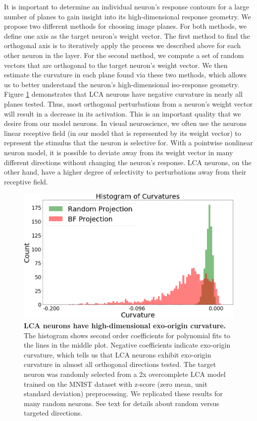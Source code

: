 It is important to determine an individual neuron’s response contours for a large number of planes to gain insight into its high-dimensional response geometry.
We propose two different methods for choosing image planes.
For both methods, we define one axis as the target neuron's weight vector.
The first method to find the orthogonal axis is to iteratively apply the process we described above for each other neuron in the layer.
For the second method, we compute a set of random vectors that are orthogonal to the target neuron’s weight vector.
We then estimate the curvature in each plane found via these two methods, which allows us to better understand the neuron’s high-dimensional iso-response geometry.
Figure \ref{fig:ch4_iso_contour_lca_hists} demonstrates that LCA neurons have negative curvature in nearly all planes tested.
Thus, most orthogonal perturbations from a neuron's weight vector will result in a decrease in its activation.
This is an important quality that we desire from our model neurons.
In visual neuroscience, we often use the neurons linear receptive field (in our model that is represented by its weight vector) to represent the stimulus that the neuron is selective for.
With a pointwise nonlinear neuron model, it is possible to deviate away from its weight vector in many different directions without changing the neuron's response.
LCA neurons, on the other hand, have a higher degree of selectivity to perturbations away from their receptive field.

\begin{figure}
    \centering
    \includegraphics[width=\textwidth]{figures/iso_contour_lca_hists.png}
    \caption{\textbf{LCA neurons have high-dimensional exo-origin curvature.} The histogram shows second order coefficients for polynomial fits to the lines in the middle plot. Negative coefficients indicate exo-origin curvature, which tells us that LCA neurons exhibit exo-origin curvature in almost all orthogonal directions tested. The target neuron was randomly selected from a 2x overcomplete LCA model trained on the MNIST dataset with z-score (zero mean, unit standard deviation) preprocessing. We replicated these results for many random neurons. See text for details about random versus targeted directions.}
    \label{fig:ch4_iso_contour_lca_hists}
\end{figure}

